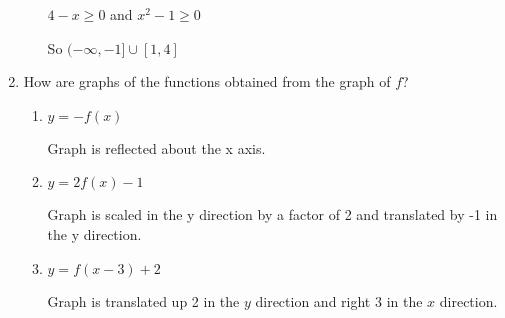 \documentclass{article}
\begin{document}
\begin{enumerate}
\begin{enumerate}
		$4 - x \geq 0$ and $x^2 - 1 \geq 0$

		So $(-\infty, -1] \cup [1, 4]$
	\end{enumerate}

	\item How are graphs of the functions obtained from the graph of $f$?
	\begin{enumerate}
		\item $y = -f(x)$

			Graph is reflected about the x axis.

		\item $y = 2f(x) - 1$

			Graph is scaled in the y direction by a factor of 2 and translated by -1 in the y direction.

		\item $y = f(x - 3) + 2$

			Graph is translated up 2 in the $y$ direction and right 3 in the $x$ direction.
	\end{enumerate}
		
\end{enumerate}
\end{document}
